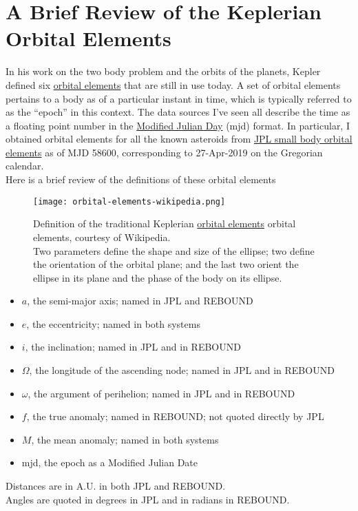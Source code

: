 \section{A Brief Review of the Keplerian Orbital Elements}
\label{section_orbital_elements}
In his work on the two body problem and the orbits of the planets, Kepler defined six 
\href{https://en.wikipedia.org/wiki/Orbital_elements}{orbital elements}
that are still in use today.
A set of orbital elements pertains to a body as of a particular instant in time, which is typically referred to as the ``epoch'' in this context.
The data sources I've seen all describe the time as a floating point number in the \href{https://en.wikipedia.org/wiki/Julian_day}{Modified Julian Day} (mjd) format.
In particular, I obtained orbital elements for all the known asteroids from \href{https://ssd.jpl.nasa.gov/?sb_elem}{JPL small body orbital elements}
as of MJD 58600, corresponding to 27-Apr-2019 on the Gregorian calendar.\\
Here is a brief review of the definitions of these orbital elements

\begin{figure}
\begin{center}
\texttt{[image: orbital-elements-wikipedia.png]}
\caption{Definition of the traditional Keplerian
\href{https://en.wikipedia.org/wiki/Orbital_elements}{orbital elements}
orbital elements, courtesy of Wikipedia.\\
Two parameters define the shape and size of the ellipse;
two define the orientation of the orbital plane; 
and the last two orient the ellipse in its plane and the phase of the body on its ellipse.}
\end{center}
\end{figure}

\begin{samepage}
\begin{itemize}
\item $a$, the semi-major axis; named  in JPL and REBOUND
\item $e$, the eccentricity; named  in both systems
\item $i$, the inclination; named  in JPL and  in REBOUND
\item $\Omega$, the longitude of the ascending node; named  in JPL and  in REBOUND
\item $\omega$, the argument of perihelion; named  in JPL and  in REBOUND
\item $f$, the true anomaly; named  in REBOUND; not quoted directly by JPL
\item $M$, the mean anomaly; named  in both systems
\item mjd, the epoch as a Modified Julian Date
\end{itemize}
\end{samepage}
Distances are in A.U. in both JPL and REBOUND.  \\
Angles are quoted in degrees in JPL and in radians in REBOUND.


